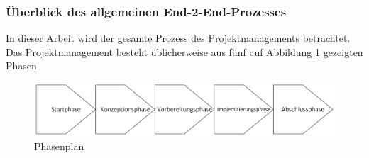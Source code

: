 \documentclass[a4paper, 12pt]{scrartcl}
\begin{document}
	\subsubsection{Überblick des allgemeinen End-2-End-Prozesses} %
In dieser Arbeit wird der gesamte Prozess des Projektmanagements betrachtet. Das Projektmanagement besteht üblicherweise aus fünf auf Abbildung \ref{Projektmanagment} gezeigten Phasen\cite{timinger2024modernes}
	\begin{figure}[h!]
		\begin{center}
			\includegraphics[width=12cm]{Drawing.png}
			\caption{Phasenplan\cite{timinger2024modernes}}
			\label{Projektmanagment}
		\end{center}
		
	\end{figure}
\end{document}
